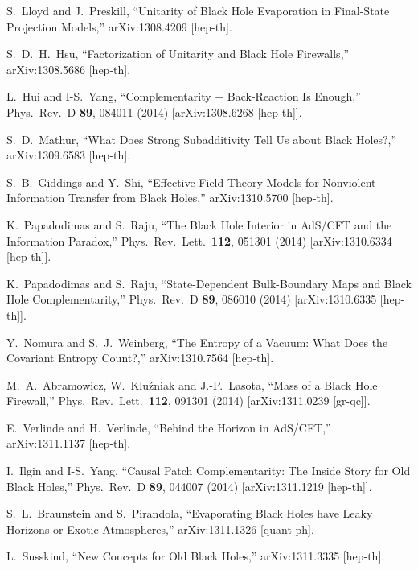\documentclass[12pt]{article}
\begin{document}
\begin{thebibliography}{99}
  S.~Lloyd and J.~Preskill,
  ``Unitarity of Black Hole Evaporation in Final-State Projection Models,''
  arXiv:1308.4209 [hep-th].

  S.~D.~H.~Hsu,
  ``Factorization of Unitarity and Black Hole Firewalls,''
  arXiv:1308.5686 [hep-th].

  L.~Hui and I-S.~Yang,
  ``Complementarity + Back-Reaction Is Enough,''
  Phys.\ Rev.\ D {\bf 89}, 084011 (2014)
  [arXiv:1308.6268 [hep-th]].

  S.~D.~Mathur,
  ``What Does Strong Subadditivity Tell Us about Black Holes?,''
  arXiv:1309.6583 [hep-th].

  S.~B.~Giddings and Y.~Shi,
  ``Effective Field Theory Models for Nonviolent Information Transfer from Black Holes,''
  arXiv:1310.5700 [hep-th].

  K.~Papadodimas and S.~Raju,
  ``The Black Hole Interior in AdS/CFT and the Information Paradox,''
  Phys.\ Rev.\ Lett.\  {\bf 112}, 051301 (2014)
  [arXiv:1310.6334 [hep-th]].

  K.~Papadodimas and S.~Raju,
  ``State-Dependent Bulk-Boundary Maps and Black Hole Complementarity,''
  Phys.\ Rev.\ D {\bf 89}, 086010 (2014)
  [arXiv:1310.6335 [hep-th]].

  Y.~Nomura and S.~J.~Weinberg,
  ``The Entropy of a Vacuum: What Does the Covariant Entropy Count?,''
  arXiv:1310.7564 [hep-th].

  M.~A.~Abramowicz, W.~Klu\'{z}niak and J.-P.~Lasota,
  ``Mass of a Black Hole Firewall,''
  Phys.\ Rev.\ Lett.\  {\bf 112}, 091301 (2014)
  [arXiv:1311.0239 [gr-qc]].

  E.~Verlinde and H.~Verlinde,
  ``Behind the Horizon in AdS/CFT,''
  arXiv:1311.1137 [hep-th].

  I.~Ilgin and I-S.~Yang,
  ``Causal Patch Complementarity: The Inside Story for Old Black Holes,''
  Phys.\ Rev.\ D {\bf 89}, 044007 (2014)
  [arXiv:1311.1219 [hep-th]].

  S.~L.~Braunstein and S.~Pirandola,
  ``Evaporating Black Holes have Leaky Horizons or Exotic Atmospheres,''
  arXiv:1311.1326 [quant-ph].

  L.~Susskind,
  ``New Concepts for Old Black Holes,''
  arXiv:1311.3335 [hep-th].


\end{thebibliography}
\end{document}

